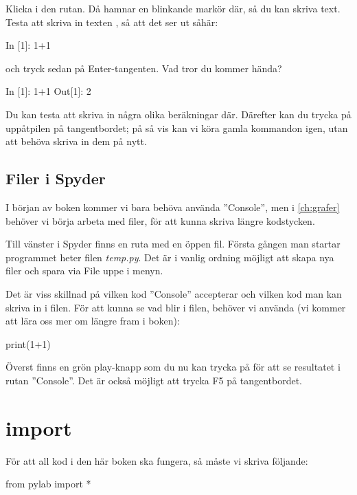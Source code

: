 Klicka i den rutan. Då hamnar en blinkande markör där, så du kan skriva text. Testa att skriva in texten , så att det ser ut såhär:

\begin{python}[caption={Skrivit in lite matte},label={}]
In [1]: 1+1
\end{python}

och tryck sedan på Enter-tangenten. Vad tror du kommer hända?

\begin{python}[caption={Hurra, datorn kan räkna!},label={}]
In [1]: 1+1
Out[1]: 2
\end{python}

Du kan testa att skriva in några olika beräkningar där. Därefter kan du trycka på uppåtpilen på tangentbordet; på så vis kan vi köra gamla kommandon igen, utan att behöva skriva in dem på nytt.

\subsection{Filer i Spyder}\label{subsec:filer}
I början av boken kommer vi bara behöva använda ''Console'', men i \autoref{ch:grafer} behöver vi börja arbeta med filer, för att kunna skriva längre kodstycken.

Till vänster i Spyder finns en ruta med en öppen fil. Första gången man startar programmet heter filen \emph{temp.py}. Det är i vanlig ordning möjligt att skapa nya filer och spara via File uppe i menyn.

Det är viss skillnad på vilken kod ''Console'' accepterar och vilken kod man kan skriva in i filen. För att kunna se vad  blir i filen, behöver vi använda  (vi kommer att lära oss mer om  längre fram i boken):

\begin{python}[caption={print},label={}]
print(1+1)
\end{python}

Överst finns en grön play-knapp som du nu kan trycka på för att se resultatet i rutan ''Console''. Det är också möjligt att trycka F5 på tangentbordet.

\section{import}
För att all kod i den här boken ska fungera, så måste vi skriva följande:

\begin{python}[caption={import för matematikuträkning},label={}]
from pylab import *
\end{python}

